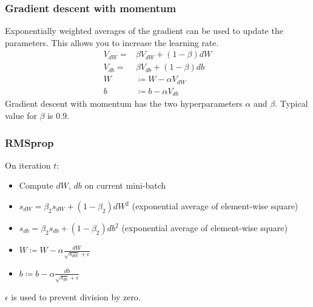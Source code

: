 \documentclass{article}
\begin{document}
\subsubsection{Gradient descent with momentum}
Exponentially weighted averages of the gradient can be used to update the parameters.
This allows you to increase the learning rate.
\begin{equation}
  \begin{split}
    V_{dW}=&\beta V_{dW}+(1-\beta)dW\\
    V_{db}=&\beta V_{db}+(1-\beta)db\\
    W&\coloneqq W-\alpha V_{dW}\\
    b&\coloneqq b-\alpha V_{db}
  \end{split}
\end{equation}
Gradient descent with momentum has the two hyperparameters $\alpha$ and $\beta$.
Typical value for $\beta$ is $0.9$.

\subsubsection{RMSprop}
On iteration $t$:
\begin{itemize}
  \item Compute $dW$, $db$ on current mini-batch
  \item $s_{dW}=\beta_2 s_{dW}+(1-\beta_2)dW^2$ (exponential average of element-wise square)
  \item $s_{db}=\beta_2 s_{db}+(1-\beta_2)db^2$ (exponential average of element-wise square)
  \item $W\coloneqq W-\alpha\frac{dW}{\sqrt{s_{dW}}+\epsilon}$
  \item $b\coloneqq b-\alpha\frac{db}{\sqrt{s_{db}}+\epsilon}$
\end{itemize}
$\epsilon$ is used to prevent division by zero.
\end{document}
